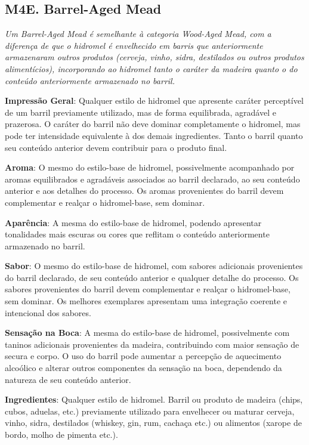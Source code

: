 \subsection*{M4E. Barrel-Aged Mead}

\textit{Um Barrel-Aged Mead é semelhante à categoria Wood-Aged Mead, com a diferença de que o hidromel é envelhecido em barris que anteriormente armazenaram outros produtos (cerveja, vinho, sidra, destilados ou outros produtos alimentícios), incorporando ao hidromel tanto o caráter da madeira quanto o do conteúdo anteriormente armazenado no barril.}

\textbf{Impressão Geral}: Qualquer estilo de hidromel que apresente caráter perceptível de um barril previamente utilizado, mas de forma equilibrada, agradável e prazerosa. O caráter do barril não deve dominar completamente o hidromel, mas pode ter intensidade equivalente à dos demais ingredientes. Tanto o barril quanto seu conteúdo anterior devem contribuir para o produto final.

\textbf{Aroma}: O mesmo do estilo-base de hidromel, possivelmente acompanhado por aromas equilibrados e agradáveis associados ao barril declarado, ao seu conteúdo anterior e aos detalhes do processo. Os aromas provenientes do barril devem complementar e realçar o hidromel-base, sem dominar.

\textbf{Aparência}: A mesma do estilo-base de hidromel, podendo apresentar tonalidades mais escuras ou cores que reflitam o conteúdo anteriormente armazenado no barril.

\textbf{Sabor}: O mesmo do estilo-base de hidromel, com sabores adicionais provenientes do barril declarado, de seu conteúdo anterior e qualquer detalhe do processo. Os sabores provenientes do barril devem complementar e realçar o hidromel-base, sem dominar. Os melhores exemplares apresentam uma integração coerente e intencional dos sabores.

\textbf{Sensação na Boca}: A mesma do estilo-base de hidromel, possivelmente com taninos adicionais provenientes da madeira, contribuindo com maior sensação de secura e corpo. O uso do barril pode aumentar a percepção de aquecimento alcoólico e alterar outros componentes da sensação na boca, dependendo da natureza de seu conteúdo anterior.

\textbf{Ingredientes}: Qualquer estilo de hidromel. Barril ou produto de madeira (chips, cubos, aduelas, etc.) previamente utilizado para envelhecer ou maturar cerveja, vinho, sidra, destilados (whiskey, gin, rum, cachaça etc.) ou alimentos (xarope de bordo, molho de pimenta etc.).

